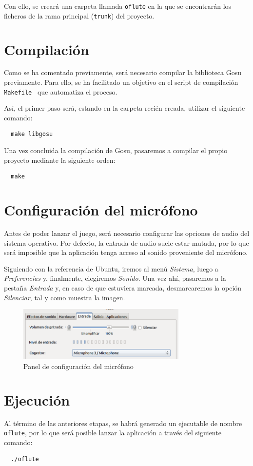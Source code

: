 Con ello, se creará una carpeta llamada \texttt{oflute} en la que se encontrarán
los ficheros de la rama principal (\texttt{trunk}) del proyecto.

\section{Compilación}

Como se ha comentado previamente, será necesario compilar la biblioteca Gosu
previamente. Para ello, se ha facilitado un objetivo en el script de compilación
\texttt{Makefile}~\cite{refmakefile} que automatiza el proceso.

Así, el primer paso será, estando en la carpeta recién creada, utilizar el
siguiente comando:

\begin{verbatim}
  make libgosu
\end{verbatim}

Una vez concluida la compilación de Gosu, pasaremos a compilar el propio
proyecto mediante la siguiente orden:

\begin{verbatim}
  make
\end{verbatim}

\section{Configuración del micrófono}
Antes de poder lanzar el juego, será necesario configurar las opciones de audio
del sistema operativo. Por defecto, la entrada de audio suele estar mutada, por
lo que será imposible que la aplicación tenga acceso al sonido proveniente del
micrófono.

Siguiendo con la referencia de Ubuntu, iremos al menú \textit{Sistema}, luego a
\textit{Preferencias} y, finalmente, elegiremos \textit{Sonido}. Una vez ahí,
pasaremos a la pestaña \textit{Entrada} y, en caso de que estuviera marcada,
desmarcaremos la opción \textit{Silenciar}, tal y como muestra la imagen.

\begin{figure}[h!]
  \centering
  \includegraphics[width=0.75\textwidth]{apendice_manual_instalacion/imagen_captura_1}
  \caption{Panel de configuración del micrófono}
\end{figure}

\vspace{-1cm}

\section{Ejecución}

Al término de las anteriores etapas, se habrá generado un ejecutable de nombre
\texttt{oflute}, por lo que será posible lanzar la aplicación a través del
siguiente comando:

\begin{verbatim}
  ./oflute
\end{verbatim}

